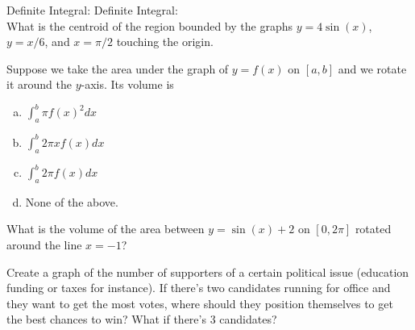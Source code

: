 \documentclass[answers]{exam}
\begin{document}
\begin{questions}
Definite Integral: \hspace{2.3in} Definite Integral:\\

\question What is the centroid of the region bounded by the graphs $y = 4\sin(x)$, $y = x/6$, and $x = \pi/2$ touching the origin.



\hfill \break
\hfill \break
\hfill \break
\hfill \break
\hfill \break
\hfill \break
\hfill \break
\hfill \break
\hfill \break
\hfill \break


\question Suppose we take the area under the graph of $y = f(x)$ on $[a ,b]$ and we rotate it around the $y$-axis. Its volume is

\begin{enumerate}[(a)]
	\item $\displaystyle \int_a^b \pi f(x)^2dx$
	\item $\displaystyle \int_a^b 2\pi x f(x)dx$
	\item $\displaystyle \int_a^b 2\pi f(x)dx$
	\item None of the above.
\end{enumerate}

\question What is the volume of the area between $y = \sin(x)+2$ on $[0, 2\pi]$ rotated around the line $x = -1$?

\hfill \break
\hfill \break
\hfill \break
\hfill \break
\hfill \break
\hfill \break
\hfill \break
\hfill \break
\hfill \break
\hfill \break

\question Create a graph of the number of supporters of a certain political issue (education funding or taxes for instance). If there's two candidates running for office and they want to get the most votes, where should they position themselves to get the best chances to win? What if there's 3 candidates?

\end{questions}
\end{document}
